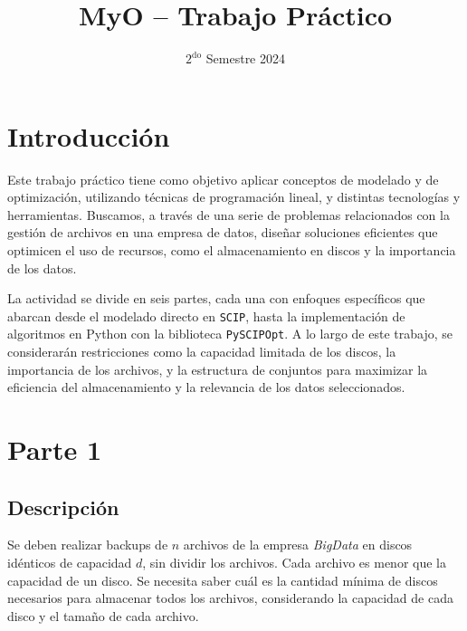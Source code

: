 \documentclass[11pt, a4paper, pdftex]{article}
\title{
	\huge MyO -- Trabajo Práctico\\
}
\author{
	\Xime \and \Lucifer \and \Lu
}
\date{\small $\text{2}^{\text{do}}$ Semestre 2024
}
\begin{document}
\renewcommand{\contentsname}{Contenidos}
\renewcommand{\listfigurename}{Listado de Figuras}
\renewcommand{\listtablename}{Listado de Tablas}
\renewcommand{\tablename}{Tabla}

\newcommand{\minimize}{\texttt{Minimize}\quad\,\,}
\newcommand{\maximize}{\texttt{Maximize}\quad\,\,}
\newcommand{\subjto}{\texttt{Subject to}\quad}

\maketitle

\tableofcontents

\section{Introducción}

Este trabajo práctico tiene como objetivo aplicar conceptos de modelado
y de optimización, utilizando técnicas de programación lineal, y distintas
tecnologías y herramientas. Buscamos, a través de una serie de problemas
relacionados con la gestión de archivos en una empresa de datos, diseñar
soluciones eficientes que optimicen el uso de recursos, como el
almacenamiento en discos y la importancia de los datos.

La actividad se divide en seis partes, cada una con enfoques específicos
que abarcan desde el modelado directo en \verb|SCIP|, hasta la
implementación de algoritmos en Python con la biblioteca
\verb|PySCIPOpt|. A lo largo de este trabajo, se considerarán restricciones
como la capacidad limitada de los discos, la importancia de los archivos,
y la estructura de conjuntos para maximizar la eficiencia del
almacenamiento y la relevancia de los datos seleccionados.

\section{Parte 1}\label{primera:parte}

\subsection{Descripción}

Se deben realizar backups de $n$ archivos de la empresa \emph{BigData}
en discos idénticos de capacidad $d$, sin dividir los archivos. Cada
archivo es menor que la capacidad de un disco. Se necesita saber cuál es
la cantidad mínima de discos necesarios para almacenar todos los
archivos, considerando la capacidad de cada disco y el tamaño de cada
archivo. 
\end{document}

